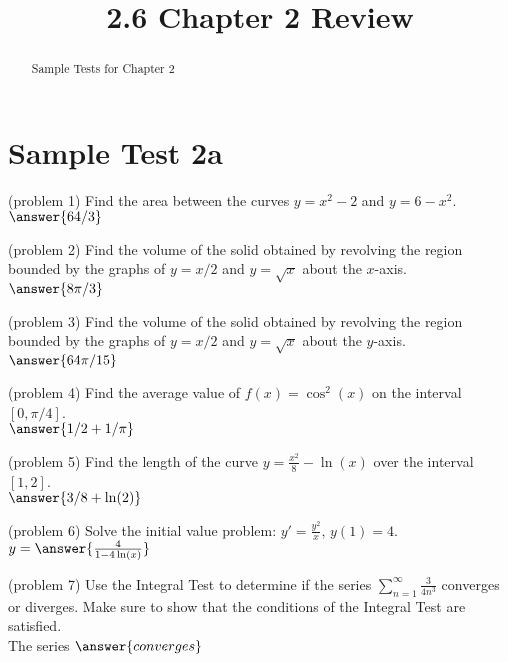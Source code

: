 \documentclass[handout]{ximera}
\title{2.6 Chapter 2 Review}
\begin{document}
\begin{abstract}
Sample Tests for Chapter 2
\end{abstract}

\maketitle

\section{Sample Test 2a}

\begin{problem}(problem 1)
Find the area between the curves $y = x^2 - 2$ and $y = 6 -x^2$.\\
$\answer{64/3}$
\end{problem}


\begin{problem}(problem 2)
Find the volume of the solid obtained by revolving the region bounded by the 
graphs of $y = x/2$ and $y = \sqrt x$ about the $x$-axis.\\
$\answer{8\pi/3}$
\end{problem}


\begin{problem}(problem 3)
Find the volume of the solid obtained by revolving the region bounded by the 
graphs of $y = x/2$ and $y = \sqrt x$ about the $y$-axis.\\
$\answer{64\pi/15}$
\end{problem}


\begin{problem}(problem 4)
Find the average value of $f(x) = \cos^2(x)$ on the interval $[0, \pi/4]$.\\
$\answer{1/2 + 1/\pi}$
\end{problem}


\begin{problem}(problem 5)
Find the length of the curve $\displaystyle y = \frac{x^2}{8} - \ln(x)$ over the interval $[1, 2]$.\\
$\answer{3/8 + \ln(2)}$
\end{problem}


\begin{problem}(problem 6)
Solve the initial value problem: $\displaystyle y' = \frac{y^2}{x},\, y(1) = 4$.\\
$y = \answer{\frac{4}{1- 4\ln(x)}}$
\end{problem}


\begin{problem}(problem 7)
Use the Integral Test to determine if the series $\displaystyle \sum_{n=1}^\infty \frac{3}{4n^3}$
converges or diverges. Make sure to show that the
conditions of the Integral Test are satisfied.\\
The series $\answer{converges}$
\end{problem}
\end{document}
